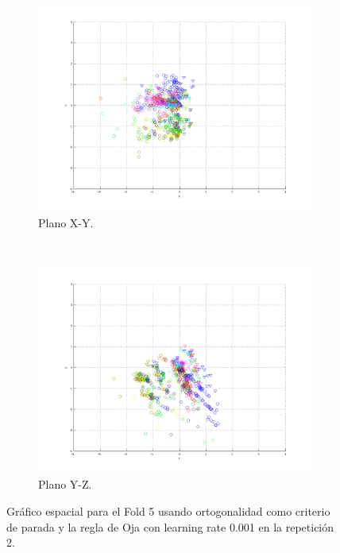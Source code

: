 \documentclass[informe.tex]{subfiles}
\begin{document}
\begin{figure}[H]
        \hspace*{-6.5cm}
        \begin{subfigure}[b]{0.49\textwidth}
                \includegraphics[width=\textwidth]{graficos/fold5_criterioParadao_reglaM_alpha0_rep2_2XY.png}
                \caption{Plano X-Y.}
        \end{subfigure}
        ~
        \begin{subfigure}[b]{0.49\textwidth}
                \includegraphics[width=\textwidth]{graficos/fold5_criterioParadao_reglaM_alpha0_rep2_3YZ.png}
                \caption{Plano Y-Z.}
                \label{fig:fold5_criterioParadao_reglaM_alpha0_rep2_3YZ}
        \end{subfigure}
	\restoregeometry
        \caption{Gráfico espacial para el Fold 5 usando ortogonalidad como criterio de parada y la regla de Oja con learning rate 0.001 en la repetición 2.}
        \label{fig:fold5_criterioParadao_reglaM_alpha0_rep2}
	\end{figure}
      
\end{document}
